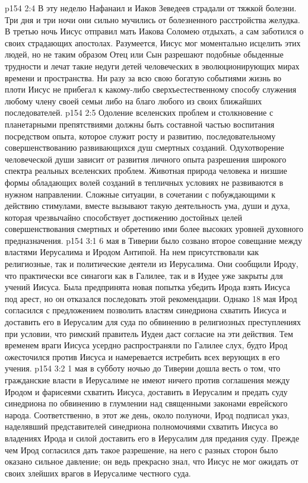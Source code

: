 \vs p154 2:4 \pc В эту неделю Нафанаил и Иаков Зеведеев страдали от тяжкой болезни. Три дня и три ночи они сильно мучились от болезненного расстройства желудка. В третью ночь Иисус отправил мать Иакова Соломею отдыхать, а сам заботился о своих страдающих апостолах. Разумеется, Иисус мог моментально исцелить этих людей, но не таким образом Отец или Сын разрешают подобные обыденные трудности и лечат такие недуги детей человеческих в эволюционирующих мирах времени и пространства. Ни разу за всю свою богатую событиями жизнь во плоти Иисус не прибегал к какому\hyp{}либо сверхъестественному способу служения любому члену своей семьи либо на благо любого из своих ближайших последователей.
\vs p154 2:5 Одоление вселенских проблем и столкновение с планетарными препятствиями должны быть составной частью воспитания посредством опыта, которое служит росту и развитию, последовательному совершенствованию развивающихся душ смертных созданий. Одухотворение человеческой души зависит от развития личного опыта разрешения широкого спектра реальных вселенских проблем. Животная природа человека и низшие формы обладающих волей созданий в тепличных условиях не развиваются в нужном направлении. Сложные ситуации, в сочетании с побуждающими к действию стимулами, вместе вызывают такую деятельность ума, души и духа, которая чрезвычайно способствует достижению достойных целей совершенствования смертных и обретению ими более высоких уровней духовного предназначения.
\vs p154 3:1 6 мая в Тиверии было созвано второе совещание между властями Иерусалима и Иродом Антипой. На нем присутствовали как религиозные, так и политические деятели из Иерусалима. Они сообщили Ироду, что практически все синагоги как в Галилее, так и в Иудее уже закрыты для учений Иисуса. Была предпринята новая попытка убедить Ирода взять Иисуса под арест, но он отказался последовать этой рекомендации. Однако 18 мая Ирод согласился с предложением позволить властям синедриона схватить Иисуса и доставить его в Иерусалим для суда по обвинению в религиозных преступлениях при условии, что римский правитель Иудеи даст согласие на эти действия. Тем временем враги Иисуса усердно распространяли по Галилее слух, будто Ирод ожесточился против Иисуса и намеревается истребить всех верующих в его учения.
\vs p154 3:2 1 мая в субботу ночью до Тиверии дошла весть о том, что гражданские власти в Иерусалиме не имеют ничего против соглашения между Иродом и фарисеями схватить Иисуса, доставить в Иерусалим и предать суду синедриона по обвинению в глумлении над священными законами еврейского народа. Соответственно, в этот же день, около полуночи, Ирод подписал указ, наделявший представителей синедриона полномочиями схватить Иисуса во владениях Ирода и силой доставить его в Иерусалим для предания суду. Прежде чем Ирод согласился дать такое разрешение, на него с разных сторон было оказано сильное давление; он ведь прекрасно знал, что Иисус не мог ожидать от своих злейших врагов в Иерусалиме честного суда.
